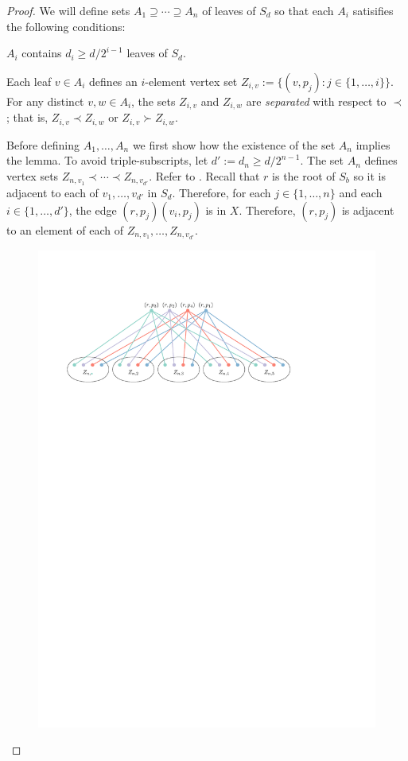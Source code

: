 \documentclass[kpfonts]{patmorin}
\renewcommand{\ge}{\geqslant}
\begin{document}
\begin{proof}
    We will define sets $A_1\supseteq \cdots\supseteq A_{n}$ of leaves of $S_d$ so that each $A_i$ satisifies the following conditions:
    \begin{compactenum}[(C1)]
        \item $A_i$ contains $d_i\ge d/2^{i-1}$ leaves of $S_d$.
        \item Each leaf $v\in A_i$ defines an $i$-element vertex set $Z_{i,v}:=\{(v,p_j):j\in\{1,\ldots,i\}\}$.  For any distinct $v,w\in A_i$, the sets $Z_{i,v}$ and $Z_{i,w}$ are \emph{separated} with respect to $\prec$; that is, $Z_{i,v}\prec Z_{i,w}$ or $Z_{i,v}\succ Z_{i,w}$.
    \end{compactenum}

    Before defining $A_1,\ldots,A_n$ we first show how the existence of the set $A_n$ implies the lemma.  To avoid triple-subscripts, let $d':=d_n\ge d/2^{n-1}$.   The set $A_n$ defines vertex sets $Z_{n,v_1}\prec\cdots\prec Z_{n,v_{d'}}$.  Refer to . Recall that $r$ is the root of $S_b$ so it is adjacent to each of $v_{1},\ldots,v_{d'}$ in $S_d$.  Therefore, for each $j\in\{1,\ldots,n\}$ and each $i\in\{1,\ldots,d'\}$, the edge $(r,p_j)(v_i,p_j)$ is in $X$. Therefore, $(r,p_j)$ is adjacent to an element of each of $Z_{n,v_1},\ldots,Z_{n,v_{d'}}$.
	\begin{figure}
		\begin{center}
			\includegraphics{figs/twister}

\end{center}
\end{figure}
\end{proof}
\end{document}
